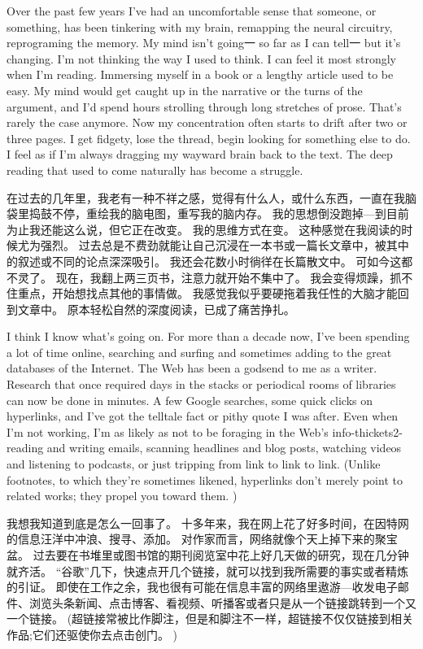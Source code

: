 \documentclass[cs4size, a4paper, 12pt]{article}
\newcounter{numpar}
\newcommand*{\newpar}{\numpar{}}
\begin{document}
	\newpar Over the past few years I've had an uncomfortable sense that someone, or something, has been tinkering with my brain, remapping the neural circuitry, reprograming the memory. My mind isn't going一 so far as I can tell一 but it's changing. I'm not thinking the way I used to think. I can feel it most strongly when I’m reading. Immersing myself in a book or a lengthy article used to be easy. My mind would get caught up in the narrative or the turns of the argument, and I’d spend hours strolling through long stretches of prose. That's rarely the case anymore. Now my concentration often starts to drift after two or three pages. I get fidgety, lose the thread, begin looking for something else to do. I feel as if I'm always dragging my wayward brain back to the text. The deep reading that used to come naturally has become a struggle. 
	
	在过去的几年里，我老有一种不祥之感，觉得有什么人，或什么东西，一直在我脑袋里捣鼓不停，重绘我的脑电图，重写我的脑内存。 我的思想倒没跑掉—到目前为止我还能这么说，但它正在改变。 我的思维方式在变。 这种感觉在我阅读的时候尤为强烈。 过去总是不费劲就能让自己沉浸在一本书或一篇长文章中，被其中的叙述或不同的论点深深吸引。 我还会花数小时徜徉在长篇散文中。 可如今这都不灵了。 现在，我翻上两三页书，注意力就开始不集中了。 我会变得烦躁，抓不住重点，开始想找点其他的事情做。 我感觉我似乎要硬拖着我任性的大脑才能回到文章中。 原本轻松自然的深度阅读，已成了痛苦挣扎。 
	
	\newpar I think I know what's going on. For more than a decade now, I've been spending a lot of time online, searching and surfing and sometimes adding to the great databases of the Internet. The Web has been a godsend to me as a writer. Research that once required days in the stacks or periodical rooms of libraries can now be done in minutes. A few Google searches, some quick clicks on hyperlinks, and I've got the telltale fact or pithy quote I was after. Even when I'm not working, I'm as likely as not to be foraging in the Web's info-thickets2-reading and writing emails, scanning headlines and blog posts, watching videos and listening to podcasts, or just tripping from link to link to link. (Unlike footnotes, to which they're sometimes likened, hyperlinks don't merely point to related works; they propel you toward them. )
	
	我想我知道到底是怎么一回事了。 十多年来，我在网上花了好多时间，在因特网的信息汪洋中冲浪、搜寻、添加。 对作家而言，网络就像个天上掉下来的聚宝盆。 过去要在书堆里或图书馆的期刊阅览室中花上好几天做的研究，现在几分钟就齐活。 ``谷歌''几下，快速点开几个链接，就可以找到我所需要的事实或者精炼的引证。 即使在工作之余，我也很有可能在信息丰富的网络里遨游—收发电子邮件、浏览头条新闻、点击博客、看视频、听播客或者只是从一个链接跳转到一个又一个链接。 (超链接常被比作脚注，但是和脚注不一样，超链接不仅仅链接到相关作品;它们还驱使你去点击创门。 )
	
\end{document}
